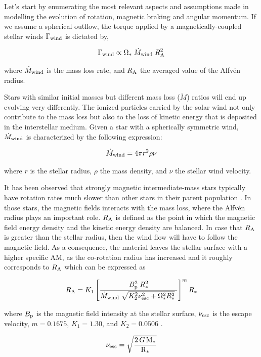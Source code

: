 \documentclass[fleqn,usenatbib]{mnras}
\begin{document}
Let's start by enumerating the most relevant aspects and assumptions made in modelling the evolution of rotation, magnetic braking and angular momentum. If we assume a spherical outflow, the torque applied by a magnetically-coupled stellar winds $\Gamma_{\mathrm{wind}}$ is dictated by,
\begin{ceqn}
\begin{equation}
    \Gamma_{\mathrm{wind}} \propto \Omega_* \; \Dot{M}_{\mathrm{wind}} \; R_{\mathrm{A}}^{2} \label{eq:mb_torque}
\end{equation}
\end{ceqn}
where $\Dot{M}_{\mathrm{wind}}$ is the mass loss rate, and $R_{\mathrm{A}}$ the averaged value of the Alfvén radius.\par
Stars with similar initial masses but different mass loss ($\Dot{M}$) ratios will end up evolving very differently. The ionized particles carried by the solar wind not only contribute to the mass loss but also to the loss of kinetic energy that is deposited in the interstellar medium. Given a star with a spherically symmetric wind, $\Dot{M}_{\mathrm{wind}}$ is characterized by the following expression:

\begin{ceqn}
\begin{equation}
    \Dot{M}_{\mathrm{wind}} = 4\pi r^2\rho\nu \label{eq:mass_loss}
\end{equation}
\end{ceqn}
where $r$ is the stellar radius, $\rho$ the mass density, and $\nu$ the stellar wind velocity.

It has been observed that strongly magnetic intermediate-mass stars typically have rotation rates much slower than other stars in their parent population \citep{Mathys2006}. In those stars, the magnetic fields interacts with the mass loss, where the Alfv\'{e}n radius plays an important role. $R_{\mathrm{A}}$ is defined as the point in which the magnetic field energy density and the kinetic energy density are balanced. In case that $R_{\mathrm{A}}$ is greater than the stellar radius, then the wind flow will have to follow the magnetic field. As a consequence, the material leaves the stellar surface with a higher specific AM, as the co-rotation radius has increased and it roughly corresponds to $R_{\mathrm{A}}$ which can be expressed as \citep{Matt2012}
\begin{ceqn}
\begin{equation}
    R_{\mathrm{A}} = K_1\left[\frac{B_{\mathrm{p}}^{2}\;R_*^{2}}{\Dot{M}_{\mathrm{wind}}\;\sqrt{K_2^2\nu_{\mathrm{esc}}^2 + \Omega_*^2R_*^{2}}\ }\right]^{m}R_*  \label{eq:mb_ralfven}
\end{equation}
\end{ceqn}
where $B_{\mathrm{p}}$ is the magnetic field intensity at the stellar surface, $\nu_{\mathrm{esc}}$ is the escape velocity, $m = 0.1675$, $K_1 = 1.30$, and $K_2 = 0.0506$ \citep{Gallet2013}.
\begin{ceqn}
\begin{equation}
\nu_{\mathrm{esc}} = \sqrt{\frac{2\,G\,\mathrm{M}_*}{\mathrm{R}_*}} \label{eq:vesc}
\end{equation}
\end{ceqn}
\end{document}
